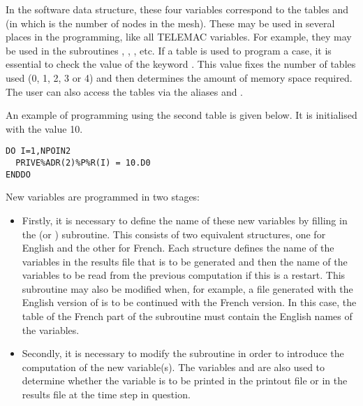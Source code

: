 In the software data structure, these four variables correspond to the tables
and  (in which  is the number of
nodes in the mesh). These may be used in several places in the programming,
like all TELEMAC variables.
For example, they may be used in the subroutines ,
, , etc.  If a  table is used
to program a case, it is essential to check the value of the keyword
.
This value fixes the number of tables used (0, 1, 2, 3 or 4)
and then determines the amount of memory space required. The user can also
access the tables via the aliases  and
.

An example of programming using the second  table is given below.
It is initialised with the value 10.

\begin{lstlisting}[language=TelFortran]
DO I=1,NPOIN2
  PRIVE%ADR(2)%P%R(I) = 10.D0
ENDDO
\end{lstlisting}

New variables are programmed in two stages:

\begin{itemize}
\item  Firstly, it is necessary to define the name of these new variables by
filling in the  (or )
subroutine. This consists of two equivalent structures, one for English and the
other for French. Each structure defines the name of the variables in the
results file that is to be generated and then the name of the variables to be
read from the previous computation if this is a restart. This subroutine
may also be modified when, for example, a file generated with the English
version of  is to be continued with the French version. In this
case, the  table of the French part of the subroutine must
contain the English names of the variables.

\item  Secondly, it is necessary to modify the 
subroutine in order to introduce the computation of the new variable(s). The
variables  and  are also used to
determine whether the variable is to be printed in the printout file or in
the results file at the time step in question.
\end{itemize}

